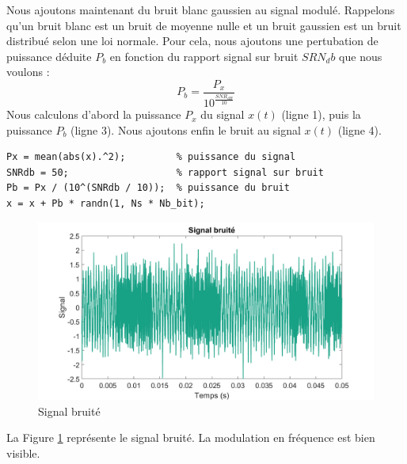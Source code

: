 Nous ajoutons maintenant du bruit blanc gaussien au signal modulé.
Rappelons qu'un bruit blanc est un bruit de moyenne nulle et un bruit gaussien est un bruit distribué selon une loi normale.
Pour cela, nous ajoutons une pertubation de puissance déduite $P_b$ en fonction du rapport signal sur bruit ${SRN_db}$ que nous voulons : \[P_b=\frac{P_x}{10^{\frac{SNR_{dB}}{10}}}\]
Nous calculons d'abord la puissance $P_x$ du signal $x(t)$ (ligne 1), puis la puissance $P_b$ (ligne 3). Nous ajoutons enfin le bruit au signal $x(t)$ (ligne 4).
\begin{lstlisting}[caption=Ajout de bruit blanc gaussien]
Px = mean(abs(x).^2);         % puissance du signal
SNRdb = 50;                   % rapport signal sur bruit
Pb = Px / (10^(SNRdb / 10));  % puissance du bruit
x = x + Pb * randn(1, Ns * Nb_bit);
\end{lstlisting}
\begin{figure}[ht!]
   \centering
   \includegraphics[scale=0.4]{partie-2/sous-partie-2/2.2.1.png}
   \caption{Signal bruité \label{fig : buit}}
\end{figure}
La Figure \ref{fig : buit} représente le signal bruité. La modulation en fréquence est bien visible.